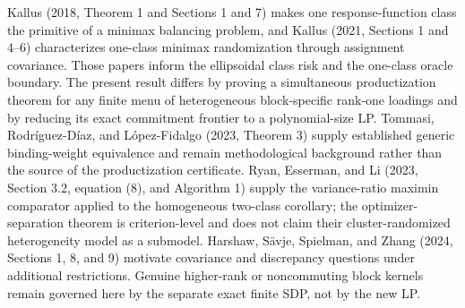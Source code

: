 Kallus (2018, Theorem 1 and Sections 1 and 7) makes one response-function class the primitive of a minimax balancing problem, and Kallus (2021, Sections 1 and 4--6) characterizes one-class minimax randomization through assignment covariance. Those papers inform the ellipsoidal class risk and the one-class oracle boundary. The present result differs by proving a simultaneous productization theorem for any finite menu of heterogeneous block-specific rank-one loadings and by reducing its exact commitment frontier to a polynomial-size LP. Tommasi, Rodr\'iguez-D\'iaz, and L\'opez-Fidalgo (2023, Theorem 3) supply established generic binding-weight equivalence and remain methodological background rather than the source of the productization certificate. Ryan, Esserman, and Li (2023, Section 3.2, equation (8), and Algorithm 1) supply the variance-ratio maximin comparator applied to the homogeneous two-class corollary; the optimizer-separation theorem is criterion-level and does not claim their cluster-randomized heterogeneity model as a submodel. Harshaw, S\"avje, Spielman, and Zhang (2024, Sections 1, 8, and 9) motivate covariance and discrepancy questions under additional restrictions. Genuine higher-rank or noncommuting block kernels remain governed here by the separate exact finite SDP, not by the new LP.